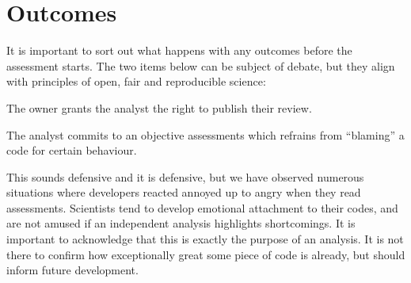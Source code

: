 \section{Outcomes}

It is important to sort out what happens with any outcomes before the assessment starts.
The two items below can be subject of debate, but they align with principles of open, fair and reproducible science:

\begin{checklist}
 \item The owner grants the analyst the right to publish their review. 
 \item The analyst commits to an objective assessments which refrains from ``blaming'' a code for certain behaviour. 
\end{checklist}

\noindent
This sounds defensive and it is defensive, but we have observed numerous situations where developers reacted annoyed up to angry when they read assessments.
Scientists tend to develop emotional attachment to their codes, and are not amused if an independent analysis highlights shortcomings.
It is important to acknowledge that this is exactly the purpose of an analysis.
It is not there to confirm how exceptionally great some piece of code is already, but should inform future development.



